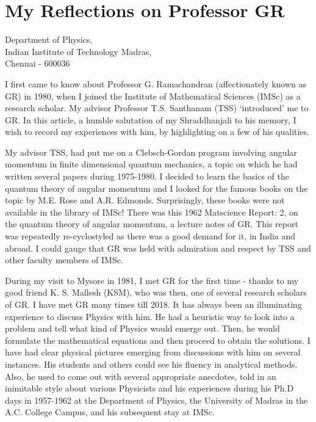 
\chapter[My Reflections on Professor GR]{My Reflections on Professor GR}\label{chap3}


\begin{center}
Department of Physics,\\
Indian Institute of Technology Madras,\\
Chennai - 600036
\end{center}

I first came to know about Professor G. Ramachandran (affectionately known as GR) in 1980, when I joined the Institute of Mathematical Sciences (IMSc) as a research scholar. My advisor Professor T.S. Santhanam (TSS) `introduced' me to GR. In this article, a humble salutation of my Shraddhanjali to his memory, I wish to record my experiences with him, by highlighting on a few of his qualities.

My advisor TSS, had put me on a Clebsch-Gordan program involving angular momentum in finite dimensional quantum mechanics, a topic on which he had written several papers during 1975-1980. I decided to learn the basics of the quantum theory of angular momentum and I looked for the famous books on the topic by M.E. Rose and A.R. Edmonds. Surprisingly, these books were not available in the library of IMSc! There was this 1962 Matscience Report: 2, on the quantum theory of angular momentum, a lecture notes of GR. This report was repeatedly re-cyclostyled as there was a good demand for it, in India and abroad. I could gauge that GR was held with admiration and respect by TSS and other faculty members of IMSc.

During my visit to Mysore in 1981, I met GR for the first time - thanks to my good friend K. S. Mallesh (KSM), who was then, one of several research scholars of GR. I have met GR many times till 2018. It has always been an illuminating experience to discuss Physics with him. He had a heuristic way to look into a problem and tell what kind of Physics would emerge out. Then, he would formulate the mathematical equations and then proceed to obtain the solutions. I have had clear physical pictures emerging from discussions with him on several instances. His students and others could see his fluency in analytical methods. Also, he used to come out with several appropriate anecdotes, told in an inimitable style about various Physicists and his experiences during his Ph.D days in 1957-1962 at the Department of Physics, the University of Madras in the A.C. College Campus, and his subsequent stay at IMSc.

